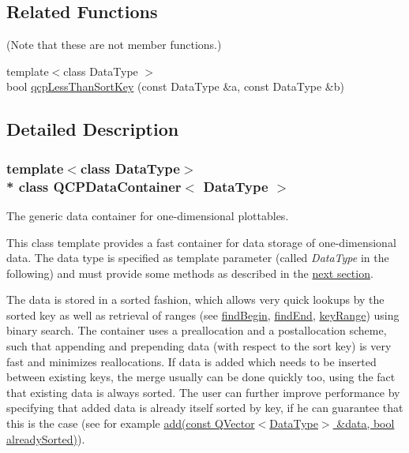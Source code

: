 \subsection*{Related Functions}
(Note that these are not member functions.) \begin{DoxyCompactItemize}
\item 
{\footnotesize template$<$class Data\+Type $>$ }\\bool \hyperlink{class_q_c_p_data_container_a74c5e06728cb6fa778a25d9ec0c4bd36}{qcp\+Less\+Than\+Sort\+Key} (const Data\+Type \&a, const Data\+Type \&b)
\end{DoxyCompactItemize}


\subsection{Detailed Description}
\subsubsection*{template$<$class Data\+Type$>$\\*
class Q\+C\+P\+Data\+Container$<$ Data\+Type $>$}

The generic data container for one-\/dimensional plottables. 

This class template provides a fast container for data storage of one-\/dimensional data. The data type is specified as template parameter (called {\itshape Data\+Type} in the following) and must provide some methods as described in the \hyperlink{class_q_c_p_data_container_qcpdatacontainer-datatype}{next section}.

The data is stored in a sorted fashion, which allows very quick lookups by the sorted key as well as retrieval of ranges (see \hyperlink{class_q_c_p_data_container_a8ffcab551fd06dd037874ef644c73467}{find\+Begin}, \hyperlink{class_q_c_p_data_container_ad9b6b0343252eb3bbd591ee28aaa4e9d}{find\+End}, \hyperlink{class_q_c_p_data_container_aba6e1a93c21ccc56a432b4a02c9d0ed2}{key\+Range}) using binary search. The container uses a preallocation and a postallocation scheme, such that appending and prepending data (with respect to the sort key) is very fast and minimizes reallocations. If data is added which needs to be inserted between existing keys, the merge usually can be done quickly too, using the fact that existing data is always sorted. The user can further improve performance by specifying that added data is already itself sorted by key, if he can guarantee that this is the case (see for example \hyperlink{class_q_c_p_data_container_a51d2a4c9ce4baf5e950b767d26673972}{add(const Q\+Vector$<$\+Data\+Type$>$ \&data, bool already\+Sorted)}).

